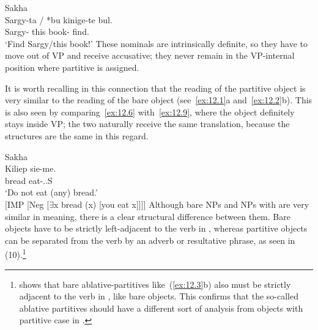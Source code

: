 \documentclass[output=paper]{langsci/langscibook}
\begin{document}
\ea\label{ex:12.8}Sakha\\
    \gll    \llap{*}Sargy-ta / *bu kinige-te  bul.\\
            Sargy-\Part{} {} \hphantom{*}this book-\Part{}  find.\Imp{}\\
    \glt    ‘Find Sargy/this book!’
\z
These nominals are intrinsically definite, so they have to move out of VP and
receive accusative; they never remain in the VP-internal position where
partitive is assigned.

It is worth recalling in this connection that the reading of the partitive
object is very similar to the reading of the bare object (see~\ref{ex:12.1}a and~\ref{ex:12.2}b).
This is also seen by comparing~\eqref{ex:12.6} with~\eqref{ex:12.9}, where the object definitely stays
inside VP; the two naturally receive the same  translation, because the
structures are the same in this regard.

\ea\label{ex:12.9}Sakha\\
	\gll    Kiliep  sie-me.\\
		    bread  eat-\Imp{}.\Neg{}.\Ssg{}S\\
	\glt    ‘Do not eat (any) bread.’\\
		    {}[IMP [Neg [${\exists}$x bread (x) [you eat x]]]]
\z
Although bare NPs and NPs with  are very similar in meaning,
there is a clear structural difference between them. Bare objects have to be
strictly left-adjacent to the verb in , whereas partitive objects can be
separated from the verb by an adverb or resultative phrase, as seen in
(10).\footnote{\textcite{Kornfilt1990,Kornfilt1996} shows that bare
    ablative-partitives like~(\ref{ex:12.3}b) also must be strictly adjacent to the verb in
    , like bare objects.  This confirms that the so-called ablative
partitives should have a different sort of analysis from objects with partitive
case in .}
\end{document}
